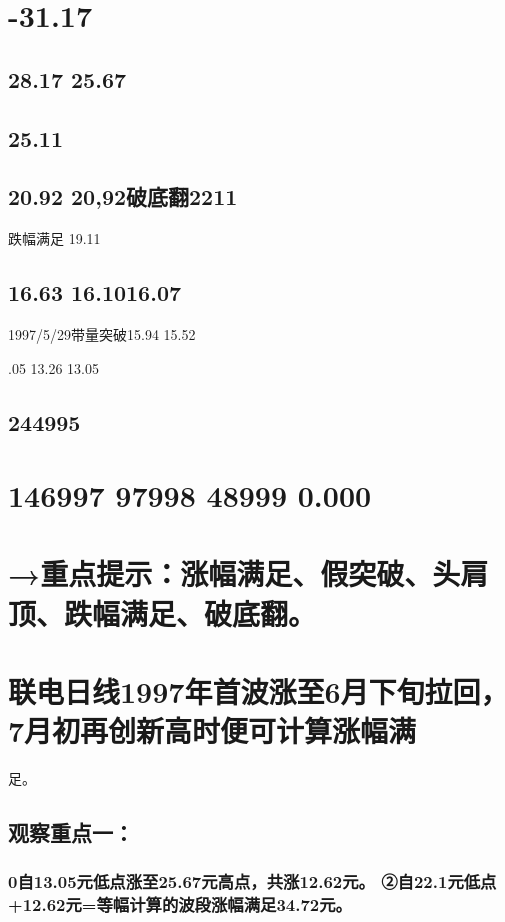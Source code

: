 \documentclass{article}
\begin{document}
\section{-31.17}

\subsection{28.17 25.67}

\subsection{25.11}

\subsection{20.92 20,92破底翻2211}

跌幅满足 19.11

\subsection{16.63 16.1016.07}

1997/5/29带量突破15.94 15.52

.05 13.26 13.05

\subsection{244995}

\section{146997 97998 48999 0.000}

\section{→重点提示：涨幅满足、假突破、头肩顶、跌幅满足、破底翻。}

\section{联电日线1997年首波涨至6月下旬拉回，7月初再创新高时便可计算涨幅满}

足。

\subsection{观察重点一：}

\subsubsection{0自13.05元低点涨至25.67元高点，共涨12.62元。 ②自22.1元低点+12.62元=等幅计算的波段涨幅满足34.72元。}
\end{document}
